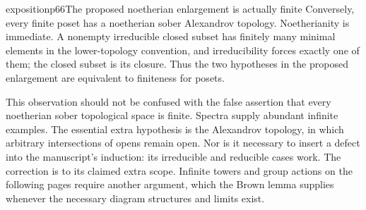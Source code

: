 \begin{dcomment}{exposition}{p66}{The proposed noetherian enlargement is actually finite}
Conversely, every finite poset has a noetherian sober Alexandrov topology. Noetherianity is immediate. A nonempty irreducible closed subset has finitely many minimal elements in the lower-topology convention, and irreducibility forces exactly one of them; the closed subset is its closure. Thus the two hypotheses in the proposed enlargement are equivalent to finiteness for posets.

This observation should not be confused with the false assertion that every noetherian sober topological space is finite. Spectra supply abundant infinite examples. The essential extra hypothesis is the Alexandrov topology, in which arbitrary intersections of opens remain open. Nor is it necessary to insert a defect into the manuscript's induction: its irreducible and reducible cases work. The correction is to its claimed extra scope. Infinite towers and group actions on the following pages require another argument, which the Brown lemma supplies whenever the necessary diagram structures and limits exist.
\end{dcomment}

